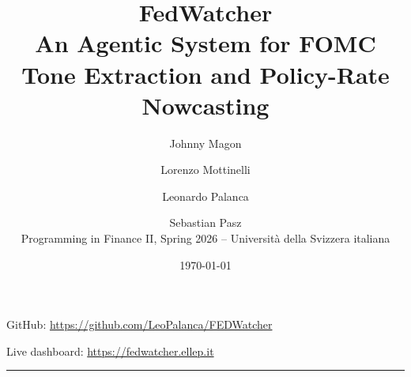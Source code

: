 \documentclass[11pt,a4paper]{article}
\title{\textbf{FedWatcher}\\\large An Agentic System for FOMC Tone Extraction and Policy-Rate Nowcasting}
\author{Johnny Magon \and Lorenzo Mottinelli \and Leonardo Palanca \and Sebastian Pasz\\
\small Programming in Finance II, Spring 2026 -- Universit\`a della Svizzera italiana}
\date{\today}
\begin{document}
\maketitle

\begin{center}
\small
GitHub: \url{https://github.com/LeoPalanca/FEDWatcher} 

Live dashboard: \url{https://fedwatcher.ellep.it}
\end{center}

\vspace{0.3em}
\hrule
\vspace{0.6em}







\end{document}
